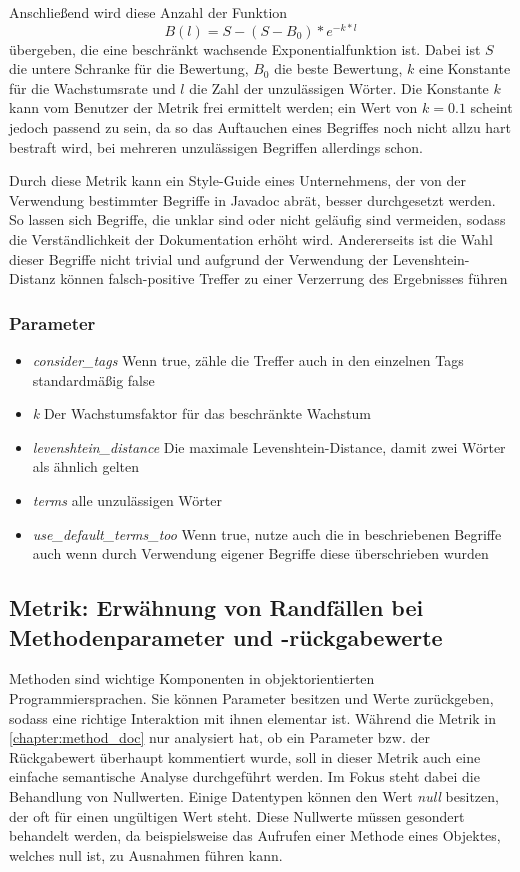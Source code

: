 Anschließend wird diese Anzahl der Funktion
\begin{equation}
     B(l)=S-(S-B_0)*e^{-k*l}
 \end{equation} übergeben, die eine beschränkt wachsende Exponentialfunktion ist. Dabei ist $S$ die untere Schranke für die Bewertung, $B_0$ die beste Bewertung,  $k$ eine Konstante für die Wachstumsrate und $l$ die Zahl der unzulässigen Wörter. 
  Die Konstante $k$ kann vom Benutzer der Metrik frei ermittelt werden; ein Wert von $k=0.1$ scheint jedoch passend zu sein, da so das Auftauchen eines Begriffes noch nicht allzu hart bestraft wird, bei mehreren unzulässigen Begriffen allerdings schon.
  
  Durch diese Metrik kann ein Style-Guide eines Unternehmens, der von der Verwendung bestimmter Begriffe in Javadoc abrät, besser durchgesetzt werden. So lassen sich Begriffe, die unklar sind oder nicht geläufig sind vermeiden, sodass die Verständlichkeit der Dokumentation erhöht wird. Andererseits ist die Wahl dieser Begriffe nicht trivial und aufgrund der Verwendung der Levenshtein-Distanz können falsch-positive Treffer zu einer Verzerrung des Ergebnisses führen
  \subsubsection{Parameter}
\begin{itemize}
    \item \textit{consider\_tags} Wenn true, zähle die Treffer auch in den einzelnen Tags standardmäßig false
    \item \textit{k} Der Wachstumsfaktor für das beschränkte Wachstum
    \item \textit{levenshtein\_distance} Die maximale Levenshtein-Distance, damit zwei Wörter als ähnlich gelten
    \item \textit{terms} alle unzulässigen Wörter
    \item \textit{use\_default\_terms\_too} Wenn true, nutze auch die in \cite{HowtoWriteDocCommentsfortheJavadocTool} beschriebenen Begriffe auch wenn durch Verwendung eigener Begriffe diese überschrieben wurden
\end{itemize}
 \subsection{Metrik: Erwähnung von Randfällen bei Methodenparameter und -rückgabewerte}\label{chapter:metric_edge_case}
 Methoden sind wichtige Komponenten in objektorientierten Programmiersprachen. Sie können Parameter besitzen und Werte zurückgeben, sodass eine richtige Interaktion mit ihnen elementar ist. Während die Metrik in \ref{chapter:method_doc} nur analysiert hat, ob ein Parameter bzw. der Rückgabewert überhaupt kommentiert wurde, soll in dieser Metrik auch eine einfache semantische Analyse durchgeführt werden. Im Fokus steht dabei die Behandlung von Nullwerten. Einige Datentypen können den Wert \textit{null} besitzen, der oft für einen ungültigen Wert steht. Diese Nullwerte müssen gesondert behandelt werden, da beispielsweise das Aufrufen einer Methode eines Objektes, welches null ist, zu Ausnahmen führen kann.
 
